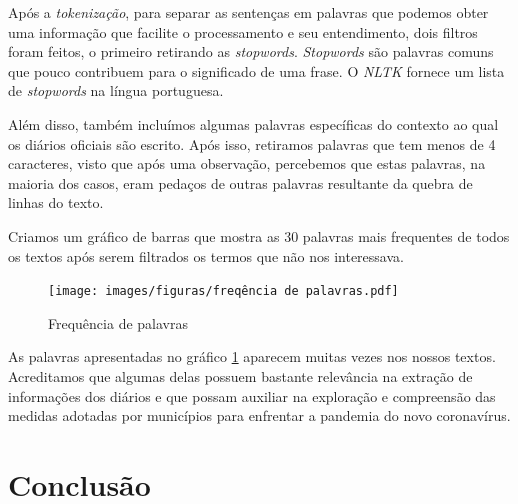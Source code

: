 \documentclass[10pt, a4paper]{article}
\begin{document}
Após a \textit{tokenização}, para separar as sentenças em palavras que podemos obter uma informação que facilite o processamento e seu entendimento, dois filtros foram feitos, o primeiro retirando as \textit{stopwords}. \textit{Stopwords} são palavras comuns que pouco contribuem para o significado de uma frase. O \textit{NLTK} fornece um lista de \textit{stopwords} na língua portuguesa. 

Além disso, também incluímos algumas palavras específicas do contexto ao qual os diários oficiais são escrito. Após isso, retiramos palavras que tem menos de 4 caracteres, visto que após uma observação, percebemos que estas palavras, na maioria dos casos, eram pedaços de outras palavras resultante da quebra de linhas do texto.

Criamos um gráfico de barras que mostra as 30 palavras mais frequentes de todos os textos após serem filtrados os termos que não nos interessava.


\begin{figure}[H]
    \centering
    \texttt{[image: images/figuras/freqência de palavras.pdf]}
    \caption{Frequência de palavras}
    \label{fig:freq_palavras}
\end{figure}


As palavras apresentadas no gráfico \ref{fig:freq_palavras} aparecem muitas vezes nos nossos textos. Acreditamos que algumas delas possuem bastante relevância na extração de informações dos diários e que possam auxiliar na exploração e compreensão das medidas adotadas por municípios para enfrentar a pandemia do novo coronavírus.


\section{Conclusão}

\end{document}
